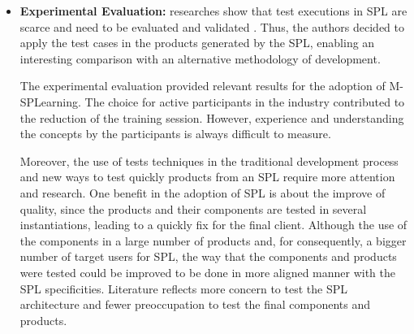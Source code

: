 \begin{itemize}
\item \textbf{Experimental Evaluation:} researches show that test executions in SPL are scarce and need to be evaluated and validated \cite{engstrom11}. Thus, the authors decided to apply the test cases in the products generated by the SPL, enabling an interesting comparison with an alternative methodology of development.

The experimental evaluation provided relevant results for the adoption of M-SPLear\allowbreak ning. The choice for active participants in the industry contributed to the reduction of the training session. However, experience and understanding the concepts by the participants is always difficult to measure.

Moreover, the use of tests techniques in the traditional development process and new ways to test quickly products from an SPL require more attention and research. One benefit in the adoption of SPL is about the improve of quality, since the products and their components are tested in several instantiations, leading to a quickly fix for the final client. Although the use of the components in a large number of products and, for consequently, a bigger number of target users for SPL, the way that the components and products were tested could be improved to be done in more aligned manner with the SPL specificities. Literature reflects more concern to test the SPL architecture and fewer preoccupation to test the final components and products.
\end{itemize}